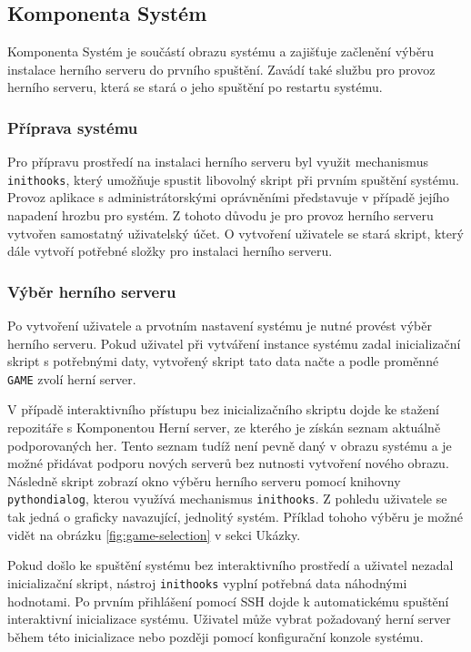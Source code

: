 \subsection{Komponenta Systém}

Komponenta Systém je součástí obrazu systému a zajišťuje začlenění výběru instalace herního serveru do prvního spuštění.
Zavádí také službu pro provoz herního serveru, která se stará o jeho spuštění po restartu systému.

\subsubsection{Příprava systému}

Pro přípravu prostředí na instalaci herního serveru byl využit mechanismus \texttt{inithooks}, který umožňuje
spustit libovolný skript při prvním spuštění systému.
Provoz aplikace s administrátorskými oprávněními představuje v případě jejího napadení hrozbu pro systém.
Z tohoto důvodu je pro provoz herního serveru vytvořen samostatný uživatelský účet. O vytvoření uživatele se stará skript,
který dále vytvoří potřebné složky pro instalaci herního serveru.

\subsubsection{Výběr herního serveru}

Po vytvoření uživatele a prvotním nastavení systému je nutné provést výběr herního serveru.
Pokud uživatel při vytváření instance systému zadal inicializační skript s potřebnými daty, vytvořený skript tato
data načte a podle proměnné \texttt{GAME} zvolí herní server.

V případě interaktivního přístupu bez inicializačního skriptu dojde ke stažení repozitáře s Komponentou Herní server,
ze kterého je získán seznam aktuálně podporovaných her. Tento seznam tudíž není pevně daný v obrazu systému a je možné
přidávat podporu nových serverů bez nutnosti vytvoření nového obrazu.
Následně skript zobrazí okno výběru herního serveru pomocí knihovny \texttt{pythondialog}, kterou využívá mechanismus
\texttt{inithooks}. Z pohledu uživatele se tak jedná o graficky navazující, jednolitý systém. Příklad tohoho výběru
je možné vidět na obrázku \ref{fig:game-selection} v sekci Ukázky.

Pokud došlo ke spuštění systému bez interaktivního prostředí a uživatel nezadal inicializační skript, nástroj \texttt{inithooks} vyplní
potřebná data náhodnými hodnotami. Po prvním přihlášení pomocí SSH dojde k automatickému spuštění interaktivní inicializace systému.
Uživatel může vybrat požadovaný herní server během této inicializace nebo později pomocí konfigurační konzole systému.

